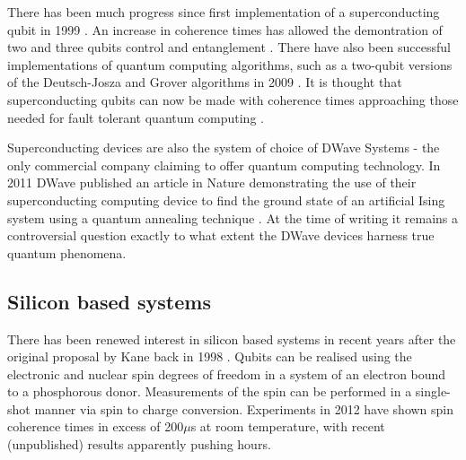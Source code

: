 There has been much progress since first implementation of a superconducting qubit in 1999 \cite{superconducting_first_qubit}. An increase in coherence times \cite{superconducting_better_coherence_03} has allowed the demontration of two and three qubits control and entanglement \cite{ superconduction_bell_violation_09, superconducting_measurement_10}. There have also been successful implementations of quantum computing algorithms, such as a two-qubit versions of the Deutsch-Josza and Grover algorithms in 2009 \cite{two_qubit_chip_yale}.
It is thought that superconducting qubits can now be made with coherence times approaching those needed for fault tolerant quantum computing \cite{superconducting_long_coherence_11}.

Superconducting devices are also the system of choice of DWave Systems - the only commercial company claiming to offer quantum computing technology. In 2011 DWave published an article in Nature demonstrating the use of their superconducting computing device to find the ground state of an artificial Ising system using a quantum annealing technique \cite{dwave_annealing}. At the time of writing it remains a controversial question exactly to what extent the DWave devices harness true quantum phenomena.

\subsection{Silicon based systems}

There has been renewed interest in silicon based systems in recent years after the original proposal by Kane back in 1998 \cite{silicon_proposal_98}. Qubits can be realised using the electronic and nuclear spin degrees of freedom in a system of an electron bound to a phosphorous donor. Measurements of the spin can be performed in a single-shot manner via spin to charge conversion. Experiments in 2012 have shown spin coherence times in excess of 200$\mu$s \cite{silicon_qubit, silicon_seconds} at room temperature, with recent (unpublished) results apparently pushing hours.


